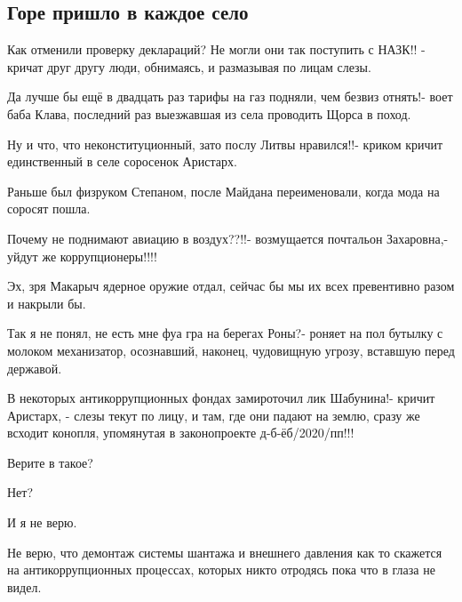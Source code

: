  
 
 

\subsection{Горе пришло в каждое село}


Как отменили проверку деклараций? Не могли они так поступить с НАЗК!! - кричат
друг другу люди, обнимаясь, и размазывая по лицам слезы.

Да лучше бы ещё в двадцать раз тарифы на газ подняли, чем безвиз отнять!- воет
баба Клава, последний раз выезжавшая из села проводить Щорса в поход.

Ну и что, что неконституционный, зато послу Литвы нравился!!- криком кричит
единственный в селе соросенок Аристарх.

Раньше был физруком Степаном, после Майдана переименовали, когда мода на
соросят пошла.

Почему не поднимают авиацию в воздух??!!- возмущается почтальон Захаровна,-
уйдут же коррупционеры!!!!

Эх, зря Макарыч ядерное оружие отдал, сейчас бы мы их всех превентивно разом и
накрыли бы.

Так я не понял, не есть мне фуа гра на берегах Роны?- роняет на пол бутылку с
молоком механизатор, осознавший, наконец, чудовищную угрозу, вставшую перед
державой.

В некоторых антикоррупционных фондах замироточил лик Шабунина!- кричит
Аристарх, - слезы текут по лицу, и там, где они падают на землю, сразу же
всходит конопля, упомянутая в законопроекте д-б-ёб/2020/пп!!!

Верите в такое?

Нет?

И я не верю.

Не верю, что демонтаж системы шантажа и внешнего давления как то скажется на
антикоррупционных процессах, которых никто отродясь пока что в глаза не видел.

